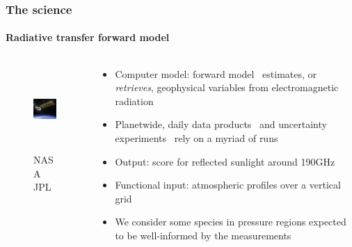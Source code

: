 \documentclass{snedecorbeamer}
\begin{document}
\begin{frame}[c]
  \frametitle{The science}
  \framesubtitle{Radiative transfer forward model}

  \begin{columns}[c]
    \begin{column}{0.2\textwidth}
      \begin{figure}
        \centering
        \includegraphics[height=8.5em]{inc/mls_aura}
        \caption*{
          \href{https://www.jpl.nasa.gov/missions/microwave-limb-sounder-mls}{}
          NASA JPL}
      \end{figure}
    \end{column}
    \begin{column}{0.7\textwidth}
      \begin{itemize}
      \item Computer model: forward
        model~\cite{read2006,schwartz2006,waters2006} estimates, or
        \emph{retrieves}, geophysical variables from electromagnetic radiation
      \item Planetwide, daily data products~\cite{liversey2020} and uncertainty
        experiments~\cite{turmon2019,braverman2021} rely on a myriad of runs
      \item Output: score for reflected sunlight around 190GHz~\cite{johnson2020}
      \item Functional input: atmospheric profiles over a vertical grid
      \item We consider some species in pressure regions expected to be
        well-informed by the measurements~\cite{liversey2020}
      \end{itemize}
    \end{column}
  \end{columns}
\end{frame}
\end{document}
